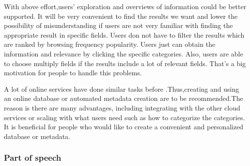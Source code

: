 With above effort,users' exploration and overviews of information could be better supported. 
It will be very convenient to find the results we want and lower the possibility of misunderstanding if users are not very familiar with finding the appropriate result in specific fields.
\cite{TunThuraThet2010} Users don not have to filter the results which are ranked by browsing frequency popularity. 
Users just can obtain the information and relevance by clicking the specific categories. 
Also, users are able to choose multiply fields if the results include a lot of relevant fields. 
That's a big motivation for people to handle this problems. 

A lot of online services have done similar tasks before .Thus,creating and using an online database or automated metadata creation are to be recommended.The reason is there are many advantages, including integrating with the other cloud services or scaling with what users need such as how to categorize the categories.
 It is beneficial for people who would like to create a convenient and personalized database or metadata.\\

\subsubsection*{Part of speech}

